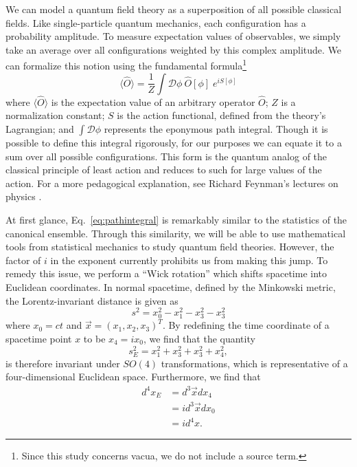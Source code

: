 We can model a quantum field theory as a superposition of all possible classical fields. Like single-particle quantum mechanics, each configuration has a probability amplitude. To measure expectation values of observables, we simply take an average over all configurations weighted by this complex amplitude. We can formalize this notion using the fundamental formula\footnote{Since this study concerns vacua, we do not include a source term.}
\begin{equation}
    \label{eq:pathintegral}
    \langle \hat O \rangle = \frac{1}{Z} \int \mathcal{D}\phi \: \hat O [\phi]\; e^{iS[\phi]}
\end{equation}
where $\langle \hat O \rangle$ is the expectation value of an arbitrary operator $\hat O$; $Z$ is a normalization constant; $S$ is the action functional, defined from the theory's Lagrangian; and $\int \mathcal{D}\phi$ represents the eponymous path integral. Though it is possible to define this integral rigorously, for our purposes we can equate it to a sum over all possible configurations. This form is the quantum analog of the classical principle of least action and reduces to such for large values of the action. For a more pedagogical explanation, see Richard Feynman's lectures on physics \cite{feynman1963a}.

At first glance, Eq.~\ref{eq:pathintegral} is remarkably similar to the statistics of the canonical ensemble. Through this similarity, we will be able to use mathematical tools from statistical mechanics to study quantum field theories. However, the factor of $i$ in the exponent currently prohibits us from making this jump. To remedy this issue, we perform a ``Wick rotation'' which shifts spacetime into Euclidean coordinates. In normal spacetime, defined by the Minkowski metric, the Lorentz-invariant distance is given as
\begin{equation}
    s^2 = x^2_0 - x^2_1- x^2_3- x^2_3
\end{equation}
where $x_0=ct$ and $\vec{x} = (x_1, x_2, x_3)^T$. By redefining the time coordinate of a spacetime point $x$ to be $x_4=ix_0$, we find that the quantity
\begin{equation}
    s_E^2 = x^2_1+ x^2_3+ x^2_3 + x^2_4,
\end{equation}
is therefore invariant under $SO(4)$ transformations, which is representative of a four-dimensional Euclidean space. Furthermore, we find that
\begin{align}
    d^4x_E &= d^3\vec{x}dx_4\nonumber \\
    &= i d^3\vec{x}dx_0 \nonumber \\
    &= i d^4x. \label{eq:wickdifferential} %
\end{align}

